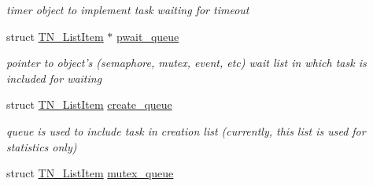 \begin{DoxyCompactItemize}
\begin{DoxyCompactList}\small\item\em timer object to implement task waiting for timeout \end{DoxyCompactList}\item 
\hypertarget{structTN__Task_a971ab5689af53bed2548c62f3bcabdc5}{struct \hyperlink{structTN__ListItem}{T\+N\+\_\+\+List\+Item} $\ast$ \hyperlink{structTN__Task_a971ab5689af53bed2548c62f3bcabdc5}{pwait\+\_\+queue}}\label{structTN__Task_a971ab5689af53bed2548c62f3bcabdc5}

\begin{DoxyCompactList}\small\item\em pointer to object's (semaphore, mutex, event, etc) wait list in which task is included for waiting \end{DoxyCompactList}\item 
\hypertarget{structTN__Task_aedb23df723d259530f10a122fec42334}{struct \hyperlink{structTN__ListItem}{T\+N\+\_\+\+List\+Item} \hyperlink{structTN__Task_aedb23df723d259530f10a122fec42334}{create\+\_\+queue}}\label{structTN__Task_aedb23df723d259530f10a122fec42334}

\begin{DoxyCompactList}\small\item\em queue is used to include task in creation list (currently, this list is used for statistics only) \end{DoxyCompactList}\item 
\hypertarget{structTN__Task_ad4decd7355c95a5b60a6774c3ee19eb9}{struct \hyperlink{structTN__ListItem}{T\+N\+\_\+\+List\+Item} \hyperlink{structTN__Task_ad4decd7355c95a5b60a6774c3ee19eb9}{mutex\+\_\+queue}}\label{structTN__Task_ad4decd7355c95a5b60a6774c3ee19eb9}


\end{DoxyCompactItemize}
